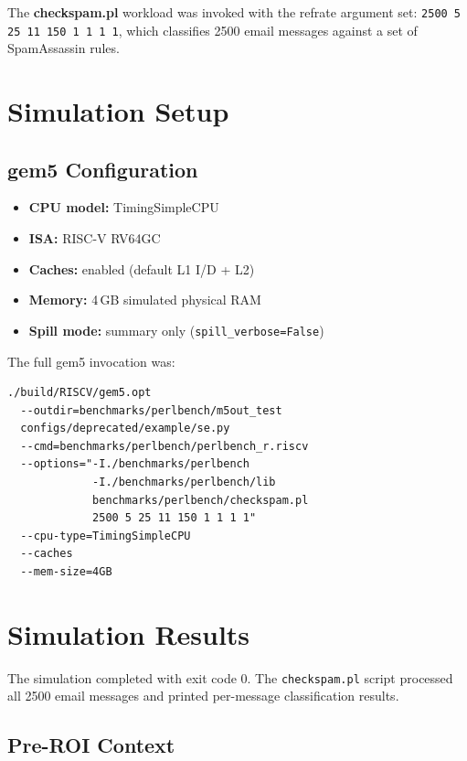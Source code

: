 \documentclass[conference]{IEEEtran}
\begin{document}
The \textbf{checkspam.pl} workload was invoked with the refrate
argument set: \texttt{2500 5 25 11 150 1 1 1 1}, which classifies
2500 email messages against a set of SpamAssassin rules.

\section{Simulation Setup}

\subsection{gem5 Configuration}

\begin{itemize}
    \item \textbf{CPU model:}   TimingSimpleCPU
    \item \textbf{ISA:}         RISC-V RV64GC
    \item \textbf{Caches:}      enabled (default L1 I/D + L2)
    \item \textbf{Memory:}      4\,GB simulated physical RAM
    \item \textbf{Spill mode:}  summary only (\texttt{spill\_verbose=False})
\end{itemize}

The full gem5 invocation was:

\begin{verbatim}
./build/RISCV/gem5.opt
  --outdir=benchmarks/perlbench/m5out_test
  configs/deprecated/example/se.py
  --cmd=benchmarks/perlbench/perlbench_r.riscv
  --options="-I./benchmarks/perlbench
             -I./benchmarks/perlbench/lib
             benchmarks/perlbench/checkspam.pl
             2500 5 25 11 150 1 1 1 1"
  --cpu-type=TimingSimpleCPU
  --caches
  --mem-size=4GB
\end{verbatim}

\section{Simulation Results}

The simulation completed with exit code 0. The \texttt{checkspam.pl}
script processed all 2500 email messages and printed per-message
classification results.

\subsection{Pre-ROI Context}
\end{document}
